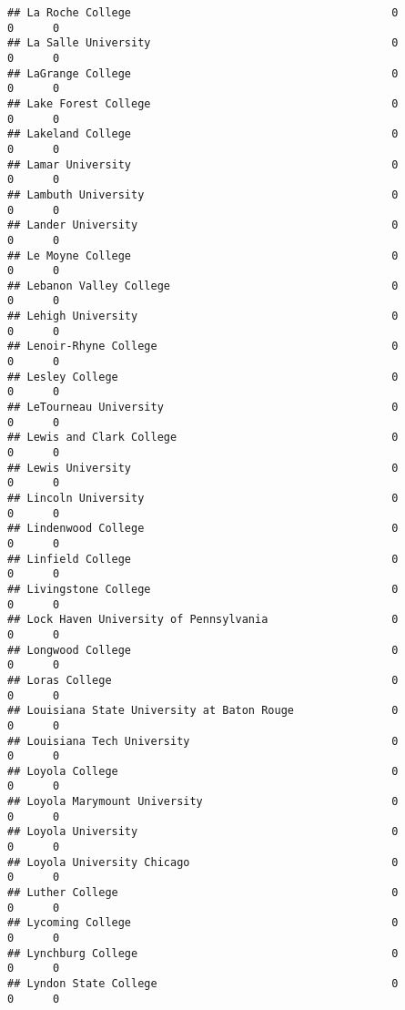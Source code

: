\documentclass[
]{article}
\begin{document}
\begin{verbatim}
## La Roche College                                        0          0      0
## La Salle University                                     0          0      0
## LaGrange College                                        0          0      0
## Lake Forest College                                     0          0      0
## Lakeland College                                        0          0      0
## Lamar University                                        0          0      0
## Lambuth University                                      0          0      0
## Lander University                                       0          0      0
## Le Moyne College                                        0          0      0
## Lebanon Valley College                                  0          0      0
## Lehigh University                                       0          0      0
## Lenoir-Rhyne College                                    0          0      0
## Lesley College                                          0          0      0
## LeTourneau University                                   0          0      0
## Lewis and Clark College                                 0          0      0
## Lewis University                                        0          0      0
## Lincoln University                                      0          0      0
## Lindenwood College                                      0          0      0
## Linfield College                                        0          0      0
## Livingstone College                                     0          0      0
## Lock Haven University of Pennsylvania                   0          0      0
## Longwood College                                        0          0      0
## Loras College                                           0          0      0
## Louisiana State University at Baton Rouge               0          0      0
## Louisiana Tech University                               0          0      0
## Loyola College                                          0          0      0
## Loyola Marymount University                             0          0      0
## Loyola University                                       0          0      0
## Loyola University Chicago                               0          0      0
## Luther College                                          0          0      0
## Lycoming College                                        0          0      0
## Lynchburg College                                       0          0      0
## Lyndon State College                                    0          0      0

\end{verbatim}
\end{document}
